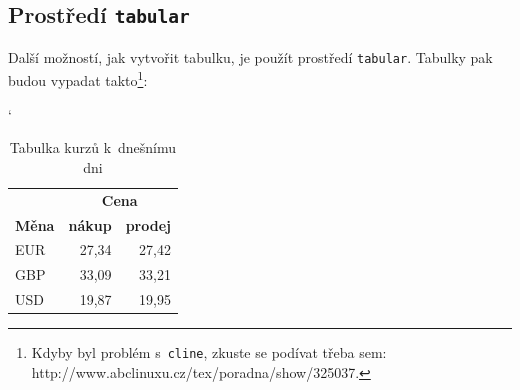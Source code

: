 \documentclass[11pt, a4paper]{article}
\begin{document}
\subsection{Prostředí \texttt{tabular}}

Další možností, jak vytvořit tabulku, je použít prostředí \texttt{tabular}. Tabulky pak 
budou vypadat takto\footnote{Kdyby byl problém s~\texttt{cline}, zkuste se podívat třeba sem: 
http://www.abclinuxu.cz/tex/poradna/show/325037.}:

\vspace{4mm}

\begin{table}[h]
\catcode`
\centering
\begin{tabular}{|l|r|r|}
\hline
\textbf{}     & \multicolumn{2}{c|}{\textbf{Cena}}                                         \\ \cline{2-3} 
\textbf{Měna} & \multicolumn{1}{l|}{\textbf{nákup}} & \multicolumn{1}{l|}{\textbf{prodej}} \\ \hline
EUR           & 27,34                               & 27,42                                \\
GBP           & 33,09                               & 33,21                                \\
USD           & 19,87                               & 19,95                                \\ \hline
\end{tabular}
\caption{Tabulka kurzů k~dnešnímu dni}
\label{tab1}
\end{table}

\vspace{4mm}
\end{document}
